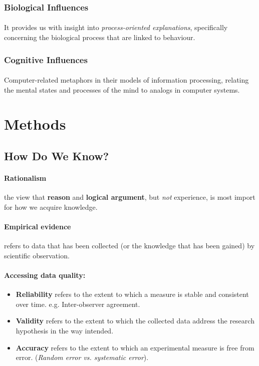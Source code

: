 \documentclass{article}
\begin{document}
 	\subsubsection{Biological Influences}
 	\paragraph{}It provides us with insight into \emph{process-oriented explanations}, specifically concerning the biological process that are linked to behaviour.
 	\subsubsection{Cognitive Influences}
 	\paragraph{}Computer-related metaphors in their models of information processing, relating the mental states and processes of the mind to analogs in computer systems.
 	\section{Methods}
 	\subsection{How Do We Know?}
 	\paragraph{Rationalism} the view that \textbf{reason} and \textbf{logical argument}, but \emph{not} experience, is most import for how we acquire knowledge.
 	\paragraph{Empirical evidence} refers to data that has been collected (or the knowledge that has been gained) by scientific observation.
 	\paragraph{Accessing data quality:}
 	\begin{itemize}
 		\item \textbf{Reliability} refers to the extent to which a measure is stable and consistent over time. e.g. Inter-observer agreement.
 		\item \textbf{Validity} refers to the extent to which the collected data address the research hypothesis in the way intended.
 		\item \textbf{Accuracy} refers to the extent to which an experimental measure is free from error. (\emph{Random error vs. systematic error}).
 	\end{itemize}
\end{document}
